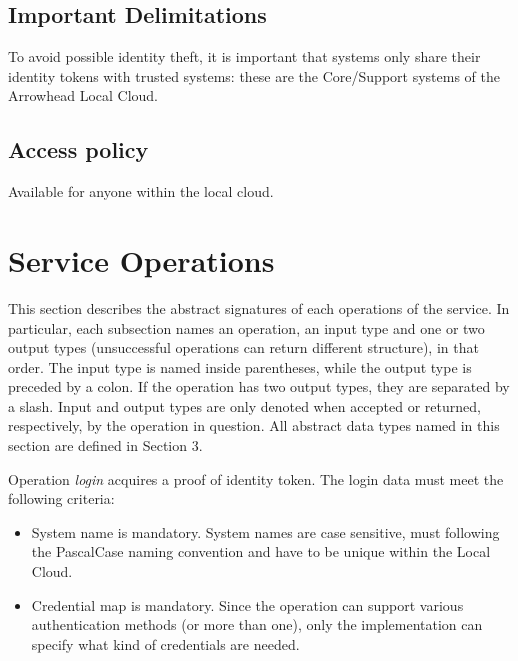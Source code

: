 \documentclass[a4paper]{arrowhead}
\begin{document}
\subsection{Important Delimitations}
\label{sec:delimitations}

To avoid possible identity theft, it is important that systems only share their identity tokens with trusted systems: these are the Core/Support systems of the Arrowhead Local Cloud. 

\subsection{Access policy}
\label{sec:accesspolicy}

Available for anyone within the local cloud.

\newpage

\section{Service Operations}
\label{sec:functions}

This section describes the abstract signatures of each operations of the service. In particular, each subsection names an operation, an input type and one or two output types (unsuccessful operations can return different structure), in that order.
The input type is named inside parentheses, while the output type is preceded by a colon. If the operation has two output types, they are separated by a slash.
Input and output types are only denoted when accepted or returned, respectively, by the operation in question. All abstract data types named in this section are defined in Section 3.

{}

Operation \textit{login} acquires a proof of identity token. The login data must meet the following criteria:

\begin{itemize}
    \item System name is mandatory. System names are case sensitive, must following the PascalCase naming convention and have to be unique within the Local Cloud.
    \item Credential map is mandatory. Since the operation can support various authentication methods (or more than one), only the implementation can specify what kind of credentials are needed.
\end{itemize}
\end{document}
